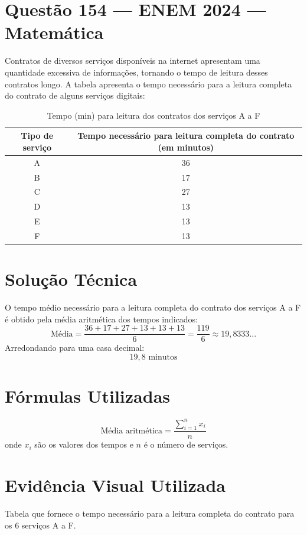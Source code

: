 \documentclass{article}
\begin{document}
\section*{Questão 154 --- ENEM 2024 --- Matemática}

Contratos de diversos serviços disponíveis na internet apresentam uma quantidade excessiva de informações, tornando o tempo de leitura desses contratos longo. A tabela apresenta o tempo necessário para a leitura completa do contrato de alguns serviços digitais:

\begin{table}[h!]
\centering
\begin{tabular}{|c|c|}
\hline
\textbf{Tipo de serviço} & \textbf{Tempo necessário para leitura completa do contrato (em minutos)} \\
\hline
A & 36 \\
B & 17 \\
C & 27 \\
D & 13 \\
E & 13 \\
F & 13 \\
\hline
\end{tabular}
\caption{Tempo (min) para leitura dos contratos dos serviços A a F}
\end{table}

\section*{Solução Técnica}

O tempo médio necessário para a leitura completa do contrato dos serviços A a F é obtido pela média aritmética dos tempos indicados:
\[
\text{Média} = \frac{36 + 17 + 27 + 13 + 13 + 13}{6} = \frac{119}{6} \approx 19,8333...
\]
Arredondando para uma casa decimal:
\[
19,8 \text{ minutos}
\]

\section*{Fórmulas Utilizadas}
\[
\text{Média aritmética} = \frac{\sum_{i=1}^n x_i}{n}
\]
onde $x_i$ são os valores dos tempos e $n$ é o número de serviços.

\section*{Evidência Visual Utilizada}

Tabela que fornece o tempo necessário para a leitura completa do contrato para os 6 serviços A a F.
\end{document}
